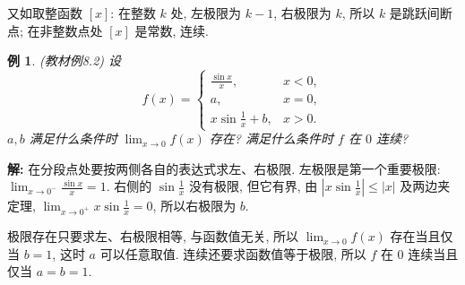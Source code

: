 \documentclass[UTF8,openany]{ctexbook}
\theoremstyle{chinesetextbook}
\newtheorem{example}{例}[section]
\newenvironment{cnsolution}{\par\indent\textbf{解:} \ignorespaces}{\par}
\begin{document}
又如取整函数 $[x]$: 在整数 $k$ 处, 左极限为 $k-1$, 右极限为 $k$, 所以 $k$ 是跳跃间断点; 在非整数点处 $[x]$ 是常数, 连续.
\begin{example}
\textnormal{(教材例8.2)} 设
\[
f(x)=\begin{cases}\frac{\sin x}x,&x<0,\\a,&x=0,\\x\sin\frac1x+b,&x>0.\end{cases}
\]
$a,b$ 满足什么条件时 $\displaystyle\lim_{x\to0}f(x)$ 存在? 满足什么条件时 $f$ 在 $0$ 连续?
\end{example}
\begin{cnsolution}
在分段点处要按两侧各自的表达式求左、右极限. 左极限是第一个重要极限: $\displaystyle\lim_{x\to0^-}\frac{\sin x}x=1$. 右侧的 $\displaystyle\sin\frac1x$ 没有极限, 但它有界, 由 $\displaystyle\left|x\sin\frac1x\right|\le|x|$ 及两边夹定理, $\displaystyle\lim_{x\to0^+}x\sin\frac1x=0$, 所以右极限为 $b$.

极限存在只要求左、右极限相等, 与函数值无关, 所以 $\displaystyle\lim_{x\to0}f(x)$ 存在当且仅当 $b=1$, 这时 $a$ 可以任意取值. 连续还要求函数值等于极限, 所以 $f$ 在 $0$ 连续当且仅当 $a=b=1$.
\end{cnsolution}
\end{document}
